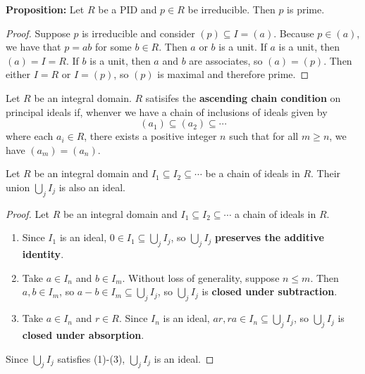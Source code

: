 \documentclass [12pt] {article}
\newenvironment{definition}[1]{\begin{tcolorbox}[title={Definition: #1},colback=blue!5!white,colframe=black!75!blue]}{\end{tcolorbox}}
\newenvironment{lemma}[1]{\begin{tcolorbox}[title={Lemma #1}]}{\end{tcolorbox}}
\renewcommand{\bf}[1]{\textbf{{#1}}}
\begin{document}
\bf{Proposition:} Let $R$ be a PID and $p \in R$ be irreducible. Then $p$ is prime.
\begin{proof}
    Suppose $p$ is irreducible and consider $(p) \subseteq I = (a)$. Because $p \in (a)$, we have
    that $p = ab$ for some $b \in R$. Then $a$ or $b$ is a unit. If $a$ is a unit, then
    $(a) = I = R$. If $b$ is a unit, then $a$ and $b$ are associates, so $(a) = (p)$. Then
    either $I = R$ or $I = (p)$, so $(p)$ is maximal and therefore prime.
\end{proof}

\begin{definition}{Ascending Chain Condition}
    Let $R$ be an integral domain. $R$ satisifes the \bf{ascending chain condition} on principal
    ideals if, whenver we have a chain of inclusions of ideals given by
    \[(a_1) \subseteq (a_2) \subseteq \cdots\]
    where each $a_i \in R$, there exists a positive integer $n$ such that for all $m \geq n$, we
    have $(a_m) = (a_n)$.
\end{definition}

\newpage
\begin{lemma}{}
    Let $R$ be an integral domain and $I_1 \subseteq I_2 \subseteq \cdots$ be a chain of ideals in
    $R$. Their union $\bigcup_j I_j$ is also an ideal.
\end{lemma}
\begin{proof}
    Let $R$ be an integral domain and $I_1 \subseteq I_2 \subseteq \cdots$ a chain of ideals in $R$.
    \begin{enumerate}[label=(\arabic*)]
        \item Since $I_1$ is an ideal, $0 \in I_1 \subseteq \bigcup_j I_j$, so $\bigcup_j I_j$
            \bf{preserves the additive identity}.
        \item Take $a \in I_n$ and $b \in I_m$. Without loss of generality, suppose $n \leq m$. Then
            $a, b \in I_m$, so $a - b \in I_m \subseteq \bigcup_j I_j$, so $\bigcup_j I_j$ is
            \bf{closed under subtraction}.
        \item Take $a \in I_n$ and $r \in R$. Since $I_n$ is an ideal,
            $ar, ra \in I_n \subseteq \bigcup_j I_j$, so $\bigcup_j I_j$ is
            \bf{closed under absorption}.
    \end{enumerate}
    Since $\bigcup_j I_j$ satisfies (1)-(3), $\bigcup_j I_j$ is an ideal.
\end{proof}
\end{document}

